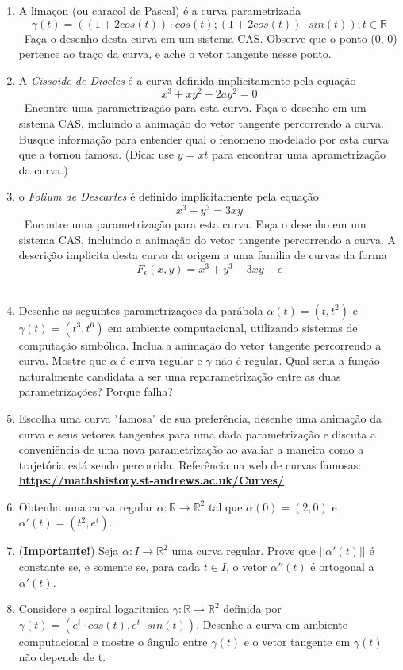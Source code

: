 \documentclass{article}
\begin{document}
\begin{enumerate}
    \item A limaçon (ou caracol de Pascal) é a curva parametrizada \
        $$\gamma(t) = ((1+2cos(t)) \cdot cos(t); (1+2cos(t)) \cdot sin(t)); t \in \mathbb{R}$$ \
        Faça o desenho desta curva em um sistema CAS. Observe que o ponto (0, 0) pertence ao traço da curva, e ache o vetor tangente nesse ponto. \
    \item A \textit{Cissoide de Diocles} é a curva definida implicitamente pela equação \
        $$x^3+xy^2-2ay^2=0$$ \
        Encontre uma parametrização para esta curva. Faça o desenho em um sistema CAS, incluindo a animação do vetor tangente percorrendo a curva. Busque informação para entender qual o fenomeno modelado por esta curva que a tornou famosa. (Dica: use $y = xt$ para encontrar uma aprametrização da curva.) \
    \item o \textit{Folium de Descartes} é definido implicitamente pela equação \
        $$x^3+y^3 = 3xy$$ \
        Encontre uma parametrização para esta curva. Faça o desenho em um sistema CAS, incluindo a animação do vetor tangente percorrendo a curva. A descrição implicita desta curva da origem a uma familia de curvas da forma \
        $$F_{\epsilon}(x, y) = x^3 + y^3 - 3xy - \epsilon$$ \
    \item Desenhe as seguintes parametrizações da parábola $\alpha(t) = (t,t^2)$ e $\gamma(t) = (t^3,t^6)$ em ambiente computacional, utilizando sistemas de computação simbólica. Inclua a animação do vetor tangente percorrendo a curva. Mostre que $\alpha$ é curva regular e $\gamma$ não é regular. Qual seria a função naturalmente candidata a ser uma reparametrização entre as duas parametrizações? Porque falha? \
    \item Escolha uma curva "famosa" de sua preferência, desenhe uma animação da curva e seus vetores tangentes para uma dada parametrização e discuta a conveniência de uma nova parametrização ao avaliar a maneira como a trajetória está sendo percorrida. Referência na web de curvas famosas: \href{https://mathshistory.st-andrews.ac.uk/
    Curves/}{\textbf{https://mathshistory.st-andrews.ac.uk/Curves/}} \
    \item Obtenha uma curva regular $\alpha : \mathbb{R} \to \mathbb{R}^2$ tal que $\alpha(0) = (2, 0)$ e $\alpha'(t) = (t^2, e^t)$. \
    \item (\textbf{Importante!}) Seja $\alpha : I \to \mathbb{R}^2$ uma curva regular. Prove que $||\alpha'(t)||$ é constante se, e somente se, para cada $t \in I$, o vetor $\alpha''(t)$ é ortogonal a $\alpha'(t)$. \
    \item Considere a espiral logaritmica $\gamma : \mathbb{R} \to \mathbb{R}^2$ definida por $\gamma(t) = (e^t \cdot cos(t), e^t \cdot sin(t))$. Desenhe a curva em ambiente computacional e mostre o ângulo entre $\gamma(t)$ e o vetor tangente em $\gamma(t)$ não depende de t. \ 
\end{enumerate}
\end{document}
